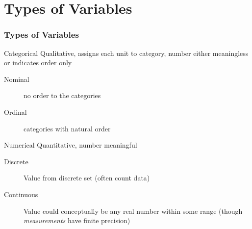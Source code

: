 \section{Types of Variables}
%
%

\begin{frame}
\frametitle{Types of Variables}
\begin{block}{Categorical}
Qualitative, assigns each unit to category, number either meaningless or indicates order only 
		\begin{description}
			\item[Nominal] no order to the categories  
			\item[Ordinal]  categories with natural order 
		\end{description}
\end{block}
\pause
\begin{block}{Numerical}
Quantitative, number meaningful 
		\begin{description}
			\item[Discrete] Value from discrete set (often count data) 
      \item[Continuous] Value could conceptually be any real number within some range (though \emph{measurements} have finite precision)
		\end{description}
\end{block}

\end{frame}

